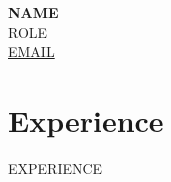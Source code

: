 \documentclass[11pt,a4paper]{article}
\begin{document}
\begin{center}
    {\Huge \textbf{{{NAME}}}} \\
    \vspace{0.5em}
    {\Large {{ROLE}}} \\
    \vspace{0.5em}
    \href{mailto:{{EMAIL}}}{{{EMAIL}}}
\end{center}

\vspace{2em}
\section*{Experience}
{{EXPERIENCE}}
\end{document}

